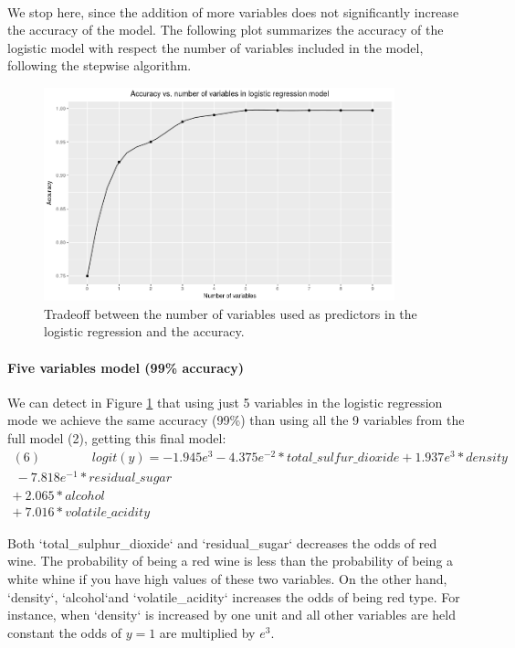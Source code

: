 \documentclass[10pt]{article}
\begin{document}
\paragraph*{}
We stop here, since the addition of more variables does not significantly increase the accuracy of the model. The following plot summarizes the accuracy of the logistic model with respect the number of variables included in the model, following the stepwise algorithm.


\begin{figure}[H]
	\centering
	\includegraphics[width=4in]{figures/accuracy-model.png} 
	\caption{Tradeoff between the number of variables used as predictors in the logistic regression and the accuracy.}
	\label{figure:accuracy-model}
\end{figure}

\paragraph{Five variables model (99\% accuracy)}
We can detect in Figure \ref{figure:accuracy-model} that using just 5 variables in the logistic regression mode we achieve the same accuracy (99\%) than using all the 9 variables from the full model (2), getting this final model:
\begin{equation*}
\begin{aligned}	
(6) \ \ \ \ \ \ \ \ \ \ \ \ \ \ \ \ \  \   logit(\hat{y}) = -1.945e^{3}  -4.375e^{-2}*total\_sulfur\_dioxide + 1.937e^{3}*density \\ \  -7.818e^{-1}*residual\_sugar \\  + \ 2.065*alcohol \\ + \ 7.016*volatile\_acidity
\end{aligned}
\end{equation*}	

Both `total\_sulphur\_dioxide` and `residual\_sugar` decreases the odds of red wine. The probability of being a red wine is less than the probability of being a white whine if you have high values of these two variables. On the other hand, `density`, `alcohol`and `volatile\_acidity` increases the odds of being red type. For instance, when `density` is increased by one unit and all other variables are held constant the odds of $y = 1$ are multiplied by $e^{3}$.
\end{document}
